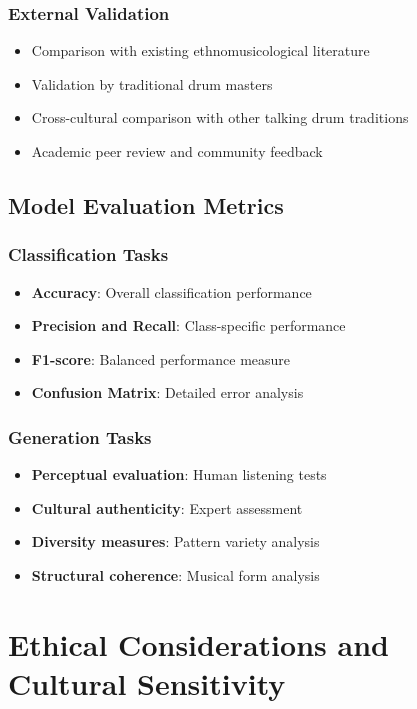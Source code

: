 \documentclass[12pt]{article}
\begin{document}
\subsubsection{External Validation}
\begin{itemize}
    \item Comparison with existing ethnomusicological literature
    \item Validation by traditional drum masters
    \item Cross-cultural comparison with other talking drum traditions
    \item Academic peer review and community feedback
\end{itemize}

\subsection{Model Evaluation Metrics}

\subsubsection{Classification Tasks}
\begin{itemize}
    \item \textbf{Accuracy}: Overall classification performance
    \item \textbf{Precision and Recall}: Class-specific performance
    \item \textbf{F1-score}: Balanced performance measure
    \item \textbf{Confusion Matrix}: Detailed error analysis
\end{itemize}

\subsubsection{Generation Tasks}
\begin{itemize}
    \item \textbf{Perceptual evaluation}: Human listening tests
    \item \textbf{Cultural authenticity}: Expert assessment
    \item \textbf{Diversity measures}: Pattern variety analysis
    \item \textbf{Structural coherence}: Musical form analysis
\end{itemize}

\section{Ethical Considerations and Cultural Sensitivity}
\end{document}
